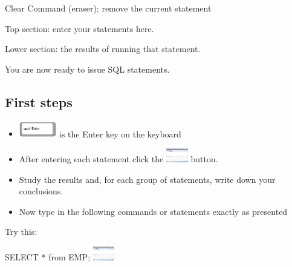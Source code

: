 \begin{center}
\begin{minipage}{2.789cm}
Clear Command (eraser); remove the current statement

\end{minipage}
\end{center}
\begin{center}
\begin{minipage}{4.706cm}
Top section: enter your statements here.
\end{minipage}
\end{center}


\begin{center}
\begin{minipage}{4.944cm}
Lower section: the results of running that statement.
\end{minipage}
\end{center}
You are now ready to issue SQL statements.

\subsection[First steps]{First steps}
\begin{itemize}
\item 
\includegraphics[width=1.63cm,height=0.683cm]{images/img (8).png}
  is the Enter key on the keyboard 
\end{itemize}
\begin{itemize}
\item After entering each statement click the 
\includegraphics[width=0.947cm,height=0.607cm]{images/img (9).png}
  button. 
\end{itemize}
\begin{itemize}
\item Study the results and, for each group of statements, write down your conclusions.
\end{itemize}
\begin{itemize}
\item Now type in the following commands or statements exactly as presented
\end{itemize}
Try this:

SELECT  *  from EMP; 
\includegraphics[width=0.947cm,height=0.607cm]{images/img (9).png}
 

